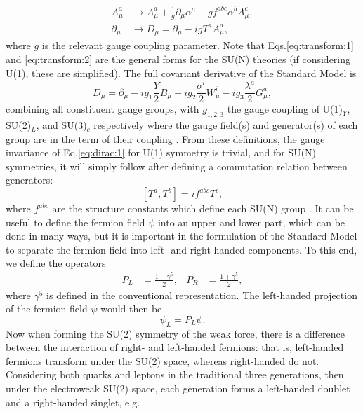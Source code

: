 \documentclass[a4paper,12pt]{article}
\begin{document}
\begin{align}
    \label{eq:transform:1}
    A^a_\mu &\to A^a_\mu + \frac{1}{g}\partial_\mu\alpha^a + gf^{abc}\alpha^bA^c_\mu, \\
    \label{eq:transform:2}
    \partial_\mu &\to D_\mu = \partial_\mu - igT^aA^a_\mu,
\end{align}
where $g$ is the relevant gauge coupling parameter.
Note that Eqs.\eqref{eq:transform:1} and \eqref{eq:transform:2} are the general forms for the SU(N) theories (if considering U(1), these are simplified).
The full covariant derivative of the Standard Model is
\begin{equation}
    \label{eq:covar}
    D_\mu = \partial_\mu - ig_1\frac{Y}{2}B_\mu - ig_2\frac{\sigma^i}{2}W^i_\mu - ig_3\frac{\lambda^a}{2}G^a_\mu,
\end{equation}
combining all constituent gauge groups, with $g_{1,2,3}$ the gauge coupling of U(1)$_Y$, SU(2)$_L$, and SU(3)$_c$ respectively where the gauge field(s) and generator(s) of each group are in the term of their coupling \cite{kane}.   
From these definitions, the gauge invariance of Eq.\eqref{eq:dirac:1} for U(1) symmetry is trivial, and for SU(N) symmetries, it will simply follow after defining a commutation relation between generators:
\begin{equation}
    \label{eq:commute}
    [T^a,T^b] = if^{abc}T^c,
\end{equation}
where $f^{abc}$ are the structure constants which define each SU(N) group \cite{bail}. 
It can be useful to define the fermion field $\psi$ into an upper and lower part, which can be done in many ways, but it is important in the formulation of the Standard Model to separate the fermion field into left- and right-handed components. 
To this end, we define the operators
\begin{align}
    \label{eq:helix}
    P_L &= \frac{1-\gamma^5}{2}, & P_R &= \frac{1+\gamma^5}{2},
\end{align}
where $\gamma^5$ is defined in the conventional representation. 
The left-handed projection of the fermion field $\psi$ would then be
\begin{equation}
    \label{eq:projection}
    \psi_L = P_L\psi.
\end{equation}
Now when forming the SU(2) symmetry of the weak force, there is a difference between the interaction of right- and left-handed fermions: that is, left-handed fermions transform under the SU(2) space, whereas right-handed do not.
Considering both quarks and leptons in the traditional three generations, then under the electroweak SU(2) space, each generation forms a left-handed doublet and a right-handed singlet, e.g.
\end{document}

